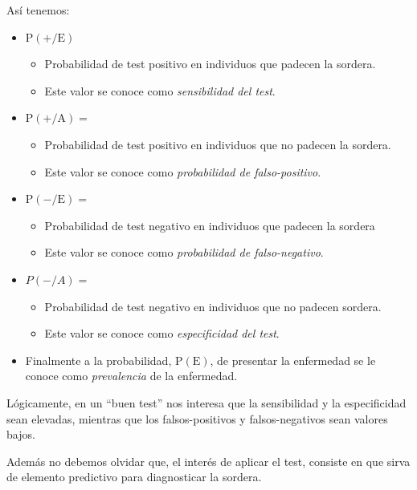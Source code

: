 \documentclass[
]{article}
\providecommand{\tightlist}{%
  \setlength{\itemsep}{0pt}\setlength{\parskip}{0pt}}
\begin{document}
Así tenemos:

\begin{itemize}
\item
  \(\mathrm{P}(+/ \mathrm{E})\)

  \begin{itemize}
  \tightlist
  \item
    Probabilidad de test positivo en individuos que padecen la sordera.
  \item
    Este valor se conoce como \emph{sensibilidad del test}.
  \end{itemize}
\item
  \(\mathrm{P}(+/ \mathrm{A})=\)

  \begin{itemize}
  \tightlist
  \item
    Probabilidad de test positivo en individuos que no padecen la sordera.
  \item
    Este valor se conoce como \emph{probabilidad de falso-positivo}.
  \end{itemize}
\item
  \(\mathrm{P}(-/ \mathrm{E})=\)

  \begin{itemize}
  \tightlist
  \item
    Probabilidad de test negativo en individuos que padecen la sordera
  \item
    Este valor se conoce como \emph{probabilidad de falso-negativo}.
  \end{itemize}
\item
  \(P(-/ A)=\)

  \begin{itemize}
  \tightlist
  \item
    Probabilidad de test negativo en individuos que no padecen sordera.
  \item
    Este valor se conoce como
    \emph{especificidad del test}.
  \end{itemize}
\item
  Finalmente a la probabilidad, \(\mathrm{P}(\mathrm{E})\), de presentar la enfermedad se le conoce como \emph{prevalencia} de la enfermedad.
\end{itemize}

Lógicamente, en un ``buen test'' nos interesa que la sensibilidad y la especificidad sean elevadas, mientras que los falsos-positivos y falsos-negativos sean valores bajos.

Además no debemos olvidar que, el interés de aplicar el test, consiste en que sirva de elemento predictivo para diagnosticar la sordera.
\end{document}
